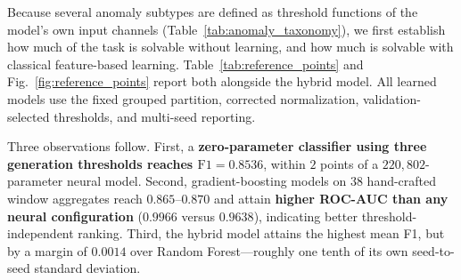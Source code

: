 \documentclass[journal]{IEEEtran}
\begin{document}
Because several anomaly subtypes are defined as threshold functions of the model's own input channels (Table~\ref{tab:anomaly_taxonomy}), we first establish how much of the task is solvable without learning, and how much is solvable with classical feature-based learning. Table~\ref{tab:reference_points} and Fig.~\ref{fig:reference_points} report both alongside the hybrid model. All learned models use the fixed grouped partition, corrected normalization, validation-selected thresholds, and multi-seed reporting.

\begin{table}[!htbp]
  \centering
  \caption{\textbf{[Fixed partition, 5 seeds]}~ Reference points on the fixed test partition ($n=4{,}799$, 157 positives)}
  \label{tab:reference_points}
  \renewcommand{\arraystretch}{1.2}
\end{table}

Three observations follow. First, a \textbf{zero-parameter classifier using three generation thresholds reaches $\mathrm{F1}=0.8536$}, within $2$ points of a $220{,}802$-parameter neural model. Second, gradient-boosting models on 38 hand-crafted window aggregates reach $0.865$--$0.870$ and attain \textbf{higher ROC-AUC than any neural configuration} ($0.9966$ versus $0.9638$), indicating better threshold-independent ranking. Third, the hybrid model attains the highest mean F1, but by a margin of $0.0014$ over Random Forest---roughly one tenth of its own seed-to-seed standard deviation.
\end{document}
